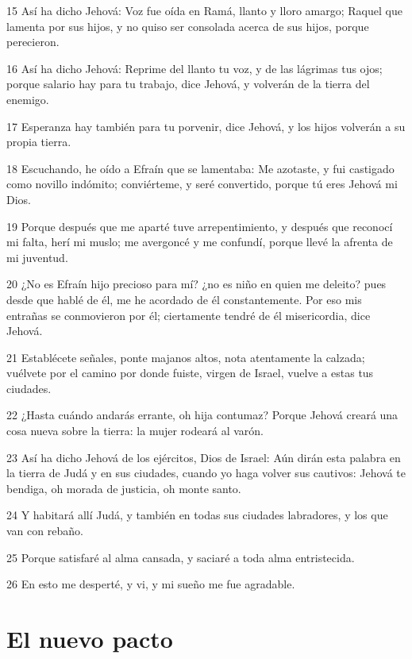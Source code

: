 \par 15 Así ha dicho Jehová: Voz fue oída en Ramá, llanto y lloro amargo; Raquel que lamenta por sus hijos, y no quiso ser consolada acerca de sus hijos, porque perecieron. 
\par 16 Así ha dicho Jehová: Reprime del llanto tu voz, y de las lágrimas tus ojos; porque salario hay para tu trabajo, dice Jehová, y volverán de la tierra del enemigo.
\par 17 Esperanza hay también para tu porvenir, dice Jehová, y los hijos volverán a su propia tierra.
\par 18 Escuchando, he oído a Efraín que se lamentaba: Me azotaste, y fui castigado como novillo indómito; conviérteme, y seré convertido, porque tú eres Jehová mi Dios.
\par 19 Porque después que me aparté tuve arrepentimiento, y después que reconocí mi falta, herí mi muslo; me avergoncé y me confundí, porque llevé la afrenta de mi juventud.
\par 20 ¿No es Efraín hijo precioso para mí? ¿no es niño en quien me deleito? pues desde que hablé de él, me he acordado de él constantemente. Por eso mis entrañas se conmovieron por él; ciertamente tendré de él misericordia, dice Jehová.
\par 21 Establécete señales, ponte majanos altos, nota atentamente la calzada; vuélvete por el camino por donde fuiste, virgen de Israel, vuelve a estas tus ciudades.
\par 22 ¿Hasta cuándo andarás errante, oh hija contumaz? Porque Jehová creará una cosa nueva sobre la tierra: la mujer rodeará al varón.
\par 23 Así ha dicho Jehová de los ejércitos, Dios de Israel: Aún dirán esta palabra en la tierra de Judá y en sus ciudades, cuando yo haga volver sus cautivos: Jehová te bendiga, oh morada de justicia, oh monte santo.
\par 24 Y habitará allí Judá, y también en todas sus ciudades labradores, y los que van con rebaño.
\par 25 Porque satisfaré al alma cansada, y saciaré a toda alma entristecida.
\par 26 En esto me desperté, y vi, y mi sueño me fue agradable.

\section*{El nuevo pacto}

